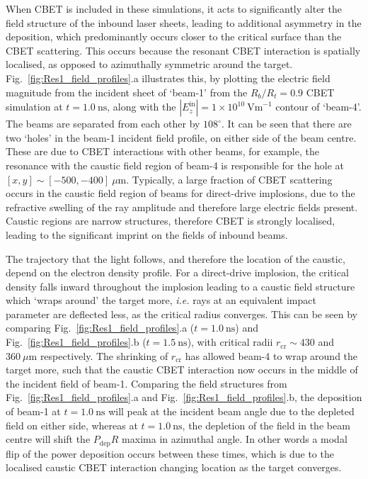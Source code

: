 When \ac{CBET} is included in these simulations, it acts to significantly alter the field structure of the inbound laser sheets, leading to additional asymmetry in the deposition, which predominantly occurs closer to the critical surface than the \ac{CBET} scattering.
This occurs because the resonant \ac{CBET} interaction is spatially localised, as opposed to azimuthally symmetric around the target.
Fig.~\ref{fig:Res1_field_profiles}.a illustrates this, by plotting the electric field magnitude from the incident sheet of `beam-1' from the $R_b/R_t=0.9$ \ac{CBET} simulation at $t=1.0\ \text{ns}$, along with the $|E_z^{\text{in}}|=1\times10^{10}\ \text{Vm}^{-1}$ contour of `beam-4'.
The beams are separated from each other by $108^{\circ}$.
It can be seen that there are two `holes' in the beam-1 incident field profile, on either side of the beam centre.
These are due to \ac{CBET} interactions with other beams, for example, the resonance with the caustic field region of beam-4 is responsible for the hole at $[x,y]\sim[-500,-400]\ \mu\text{m}$.
Typically, a large fraction of \ac{CBET} scattering occurs in the caustic field region of beams for direct-drive implosions, due to the refractive swelling of the ray amplitude and therefore large electric fields present.
Caustic regions are narrow structures, therefore \ac{CBET} is strongly localised, leading to the significant imprint on the fields of inbound beams.

The trajectory that the light follows, and therefore the location of the caustic, depend on the electron density profile.
For a direct-drive implosion, the critical density falls inward throughout the implosion leading to a caustic field structure which `wraps around' the target more, \textit{i.e.} rays at an equivalent impact parameter are deflected less, as the critical radius converges.
This can be seen by comparing Fig.~\ref{fig:Res1_field_profiles}.a ($t=1.0\ \text{ns}$) and Fig.~\ref{fig:Res1_field_profiles}.b ($t=1.5\ \text{ns}$), with critical radii $r_{\text{cr}}\sim430$ and $360\ \mu\text{m}$ respectively.
The shrinking of $r_{\text{cr}}$ has allowed beam-4 to wrap around the target more, such that the caustic \ac{CBET} interaction now occurs in the middle of the incident field of beam-1.
Comparing the field structures from Fig.~\ref{fig:Res1_field_profiles}.a and Fig.~\ref{fig:Res1_field_profiles}.b, the deposition of beam-1 at $t=1.0\ \text{ns}$ will peak at the incident beam angle due to the depleted field on either side, whereas at $t=1.0\ \text{ns}$, the depletion of the field in the beam centre will shift the $P_{\text{dep}}R$ maxima in azimuthal angle.
In other words a modal flip of the power deposition occurs between these times, which is due to the localised caustic \ac{CBET} interaction changing location as the target converges.

